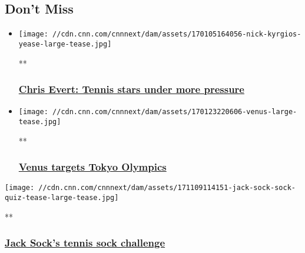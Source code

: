 \hypertarget{dont-miss-}{%
\subsection{Don't Miss~}\label{dont-miss-}}

\begin{itemize}
\item
  \href{/videos/sports/2017/01/05/chris-evert-tennis-roger-federer-serena-williams-angelique-kerber-australian-open-intv.cnn}{}

  \texttt{[image: //cdn.cnn.com/cnnnext/dam/assets/170105164056-nick-kyrgios-yease-large-tease.jpg]}

  **

  \hypertarget{chris-evert-tennis-stars-under-more-pressure}{%
  \subsubsection{\texorpdfstring{\href{/videos/sports/2017/01/05/chris-evert-tennis-roger-federer-serena-williams-angelique-kerber-australian-open-intv.cnn}{Chris
  Evert: Tennis stars under more
  pressure}}{Chris Evert: Tennis stars under more pressure}}\label{chris-evert-tennis-stars-under-more-pressure}}
\item
  \href{/videos/sports/2017/03/03/venus-williams-tokyo-olympics-snell-intv.cnn}{}

  \texttt{[image: //cdn.cnn.com/cnnnext/dam/assets/170123220606-venus-large-tease.jpg]}

  **

  \hypertarget{venus-targets-tokyo-olympics-}{%
  \subsubsection{\texorpdfstring{\href{/videos/sports/2017/03/03/venus-williams-tokyo-olympics-snell-intv.cnn}{Venus
  targets Tokyo Olympics
  }}{Venus targets Tokyo Olympics }}\label{venus-targets-tokyo-olympics-}}
\end{itemize}

\href{/videos/sports/2017/11/09/jack-sock-tennis-sock-quiz-rafa-nadal-roger-federer-orig.cnn}{}

\texttt{[image: //cdn.cnn.com/cnnnext/dam/assets/171109114151-jack-sock-sock-quiz-tease-large-tease.jpg]}

**

\hypertarget{jack-socks-tennis-sock-challenge}{%
\subsubsection{\texorpdfstring{\href{/videos/sports/2017/11/09/jack-sock-tennis-sock-quiz-rafa-nadal-roger-federer-orig.cnn}{Jack
Sock's tennis sock
challenge}}{Jack Sock's tennis sock challenge}}\label{jack-socks-tennis-sock-challenge}}


